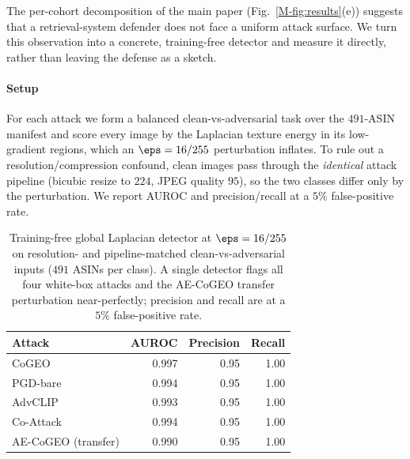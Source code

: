 The per-cohort decomposition of the main paper (Fig.~\ref{M-fig:results}(e)) suggests that a retrieval-system defender does not face a uniform attack surface. We turn this observation into a concrete, training-free detector and measure it directly, rather than leaving the defense as a sketch.

\paragraph{Setup} For each attack we form a balanced clean-vs-adversarial task over the $491$-ASIN manifest and score every image by the Laplacian texture energy in its low-gradient regions, which an $\eps = 16/255$ perturbation inflates. To rule out a resolution/compression confound, clean images pass through the \emph{identical} attack pipeline (bicubic resize to $224$, JPEG quality $95$), so the two classes differ only by the perturbation. We report AUROC and precision/recall at a $5\%$ false-positive rate.

\begin{table}[t]
\centering
\caption{Training-free global Laplacian detector at $\eps = 16/255$ on resolution- and pipeline-matched clean-vs-adversarial inputs ($491$ ASINs per class). A single detector flags all four white-box attacks and the AE-CoGEO transfer perturbation near-perfectly; precision and recall are at a $5\%$ false-positive rate.}
\label{sm:tab:defense}
\footnotesize
\setlength{\tabcolsep}{4pt}
\begin{tabular}{lrrr}
\toprule
Attack & AUROC & Precision & Recall \\
\midrule
CoGEO     & 0.997 & 0.95 & 1.00 \\
PGD-bare  & 0.994 & 0.95 & 1.00 \\
AdvCLIP   & 0.993 & 0.95 & 1.00 \\
Co-Attack & 0.994 & 0.95 & 1.00 \\
\midrule
AE-CoGEO (transfer) & 0.990 & 0.95 & 1.00 \\
\bottomrule
\end{tabular}
\end{table}

